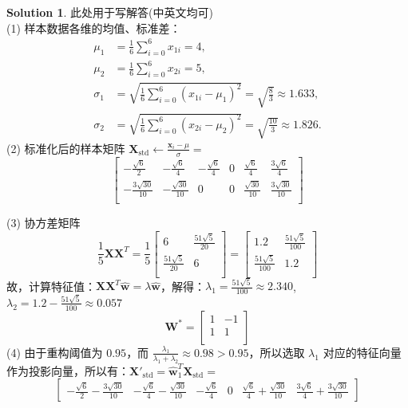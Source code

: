 \documentclass[a4paper,UTF8]{article}
\numberwithin{equation}{section}
\theoremstyle{definition}
\newtheorem*{solution}{Solution}
\def \X {\mathbf{X}}
\def \W {\mathbf{W}}
\def \w {\hat{\boldsymbol{w}}}
\def \x {\boldsymbol{x}}
\begin{document}
\begin{solution}
此处用于写解答(中英文均可)
~\\
(1) 样本数据各维的均值、标准差：
\begin{align*}
\mu_1 &= \frac{1}{6}\sum_{i=0}^{6}x_{1i} = 4, \\
\mu_2 &= \frac{1}{6}\sum_{i=0}^{6}x_{2i} = 5, \\
\sigma_1 &= \sqrt{\frac{1}{6}\sum_{i=0}^{6}(x_{1i} - \mu_1)^2} = \sqrt{\frac{8}{3}} \approx 1.633, \\
\sigma_2 &= \sqrt{\frac{1}{6}\sum_{i=0}^{6}(x_{2i} - \mu_2)^2} = \sqrt{\frac{10}{3}} \approx 1.826.
\end{align*}
(2) 标准化后的样本矩阵 $\X_{\text{std}} \leftarrow \frac{\x_i - \mu}{\sigma} =$
$$
\begin{bmatrix}
-{\frac{\sqrt{6}}{2}} & -{\frac{\sqrt{6}}{4}} & -{\frac{\sqrt{6}}{4}} & 0  & {\frac{\sqrt{6}}{4}} & {\frac{3\sqrt{6}}{4}}\\
-{\frac{3\sqrt{30}}{10}} & -{\frac{\sqrt{30}}{10}} & 0 & 0  & {\frac{\sqrt{30}}{10}} & {\frac{3\sqrt{30}}{10}}\\
\end{bmatrix}
$$

(3) 协方差矩阵
$$
\frac{1}{5}\X\X^T = \frac{1}{5}
\begin{bmatrix}
6 & {\frac{51\sqrt{5}}{20}} \\
{\frac{51\sqrt{5}}{20}} & 6 \\

\end{bmatrix}
=
\begin{bmatrix}
1.2 & {\frac{51\sqrt{5}}{100}} \\
{\frac{51\sqrt{5}}{100}} & 1.2 \\
\end{bmatrix}
$$
故，计算特征值：$\X\X^T \w = \lambda \w$，解得：$\lambda_1 = \frac{51\sqrt{5}}{100} \approx 2.340$, $\lambda_2 = 1.2 - \frac{51\sqrt{5}}{100} \approx 0.057$
$$\W^* = 
\begin{bmatrix}
1 & -1 \\
1 & 1 \\
\end{bmatrix}
$$
(4) 由于重构阈值为 $0.95$，而 $\frac{\lambda_1}{\lambda_1 + \lambda_2} \approx 0.98 > 0.95$，所以选取 $\lambda_1$ 对应的特征向量作为投影向量，所以有：$\X'_{\text{std}} = \w_{\text{1}}^T\X_{\text{std}} =$ 
$$
\begin{bmatrix}
-{\frac{\sqrt{6}}{2}}-{\frac{3\sqrt{30}}{10}} & -{\frac{\sqrt{6}}{4}}-{\frac{\sqrt{30}}{10}} & -{\frac{\sqrt{6}}{4}}& 0 & {\frac{\sqrt{6}}{4}}+{\frac{\sqrt{30}}{10}} & {\frac{3\sqrt{6}}{4}}+{\frac{3\sqrt{30}}{10}}  
\end{bmatrix}
$$
\end{solution}
\end{document}
